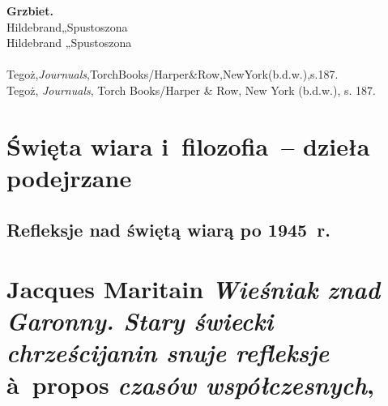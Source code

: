 \documentclass[a4paper,11pt]{article}
\numberwithin{equation}{section}
\begin{document}
\VerSpaceTwo


\noindent
\textbf{Grzbiet.} \\
\Jest Hildebrand„Spustoszona \\
\PowinnoByc Hildebrand „Spustoszona \\
 \\
\Jest  Tegoż,\textit{Journuals},TorchBooks/Harper{\&}Row,NewYork(b.d.w.),s.187. \\
\PowinnoByc Tegoż, \textit{Journuals}, Torch Books/Harper \& Row, New York
(b.d.w.), s. 187. \\











\newpage

\section{Święta wiara i~filozofia~-- dzieła podejrzane}

\VerSpaceTwo



\subsection{Refleksje nad świętą wiarą po 1945~r.}

\VerSpaceThree



\section{Jacques Maritain \textit{Wieśniak znad Garonny.
    Stary świecki chrześcijanin snuje
    refleksje} \`{a}~propos \textit{czasów współczesnych},
  \cite{MaritainWiesniakZnadGaronny2017}}



\end{document}
